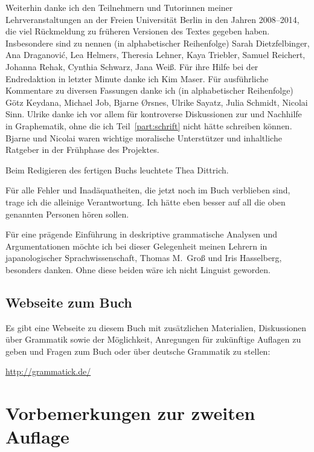 Weiterhin danke ich den Teilnehmern und Tutorinnen meiner Lehrveranstaltungen an der Freien Universität Berlin in den Jahren 2008--2014, die viel Rückmeldung zu früheren Versionen des Textes gegeben haben.
Insbesondere sind zu nennen (in alphabetischer Reihenfolge) Sarah Dietzfelbinger, Ana Draganovi\'{c}, Lea Helmers, Theresia Lehner, Kaya Triebler, Samuel Reichert, Johanna Rehak, Cynthia Schwarz, Jana Weiß.
Für ihre Hilfe bei der Endredaktion in letzter Minute danke ich Kim Maser.
Für ausführliche Kommentare zu diversen Fassungen danke ich (in alphabetischer Reihenfolge) Götz Keydana, Michael Job, Bjarne Ørsnes, Ulrike Sayatz, Julia Schmidt, Nicolai Sinn.
Ulrike danke ich vor allem für kontroverse Diskussionen zur und Nachhilfe in Graphematik, ohne die ich Teil~\ref{part:schrift} nicht hätte schreiben können.
Bjarne und Nicolai waren wichtige moralische Unterstützer und inhaltliche Ratgeber in der Frühphase des Projektes.

Beim Redigieren des fertigen Buchs leuchtete Thea Dittrich.

Für alle Fehler und Inadäquatheiten, die jetzt noch im Buch verblieben sind, trage ich die alleinige Verantwortung.
Ich hätte eben besser auf all die oben genannten Personen hören sollen.

Für eine prägende Einführung in deskriptive grammatische Analysen und Argumentationen möchte ich bei dieser Gelegenheit meinen Lehrern in japanologischer Sprachwissenschaft, Thomas M.\ Groß und Iris Hasselberg, besonders danken.
Ohne diese beiden wäre ich nicht Linguist geworden.

\section*{Webseite zum Buch}

Es gibt eine Webseite zu diesem Buch mit zusätzlichen Materialien, Diskussionen über Grammatik sowie der Möglichkeit, Anregungen für zukünftige Auflagen zu geben und Fragen zum Buch oder über deutsche Grammatik zu stellen:

\begin{center}
  \Large \url{http://grammatick.de/}
\end{center}



\chapter*{Vorbemerkungen zur zweiten Auflage}


